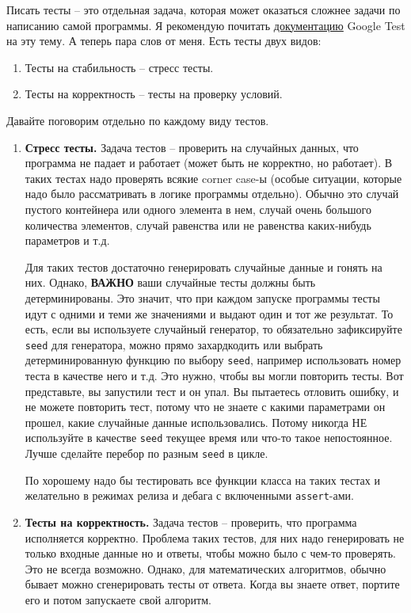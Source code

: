 \documentclass{article}
\begin{document}
Писать тесты -- это отдельная задача, которая может оказаться сложнее задачи по написанию самой программы. Я рекомендую почитать \href{https://google.github.io/googletest/primer.html}{документацию} Google Test на эту тему. А теперь пара слов от меня. Есть тесты двух видов:
\begin{enumerate}
\item Тесты на стабильность -- стресс тесты.
\item Тесты на корректность -- тесты на проверку условий.
\end{enumerate}
Давайте поговорим отдельно по каждому виду тестов.
\begin{enumerate}
\item \textbf{Стресс тесты.} Задача тестов -- проверить на случайных данных, что программа не падает и работает (может быть не корректно, но работает). В таких тестах надо проверять всякие corner case-ы (особые ситуации, которые надо было рассматривать в логике программы отдельно). Обычно это случай пустого контейнера или одного элемента в нем, случай очень большого количества элементов, случай равенства или не равенства каких-нибудь параметров и т.д.

Для таких тестов достаточно генерировать случайные данные и гонять на них. Однако, \textbf{ВАЖНО} ваши случайные тесты должны быть детерминированы. Это значит, что при каждом запуске программы тесты идут с одними и теми же значениями и выдают один и тот же результат. То есть, если вы используете случайный генератор, то обязательно зафиксируйте \verb"seed" для генератора, можно прямо захардкодить или выбрать детерминированную функцию по выбору \verb"seed", например использовать номер теста в качестве него и т.д. Это нужно, чтобы вы могли повторить тесты. Вот представьте, вы запустили тест и он упал. Вы пытаетесь отловить ошибку, и не можете повторить тест, потому что не знаете с какими параметрами он прошел, какие случайные данные использовались. Потому никогда НЕ используйте в качестве \verb"seed" текущее время или что-то такое непостоянное. Лучше сделайте перебор по разным \verb"seed" в цикле.

По хорошему надо бы тестировать все функции класса на таких тестах и желательно в режимах релиза и дебага с включенными \verb"assert"-ами.

\item \textbf{Тесты на корректность.} Задача тестов -- проверить, что программа исполняется корректно. Проблема таких тестов, для них надо генерировать не только входные данные но и ответы, чтобы можно было с чем-то проверять. Это не всегда возможно. Однако, для математических алгоритмов, обычно бывает можно сгенерировать тесты от ответа. Когда вы знаете ответ, портите его и потом запускаете свой алгоритм.


\end{enumerate}
\end{document}
